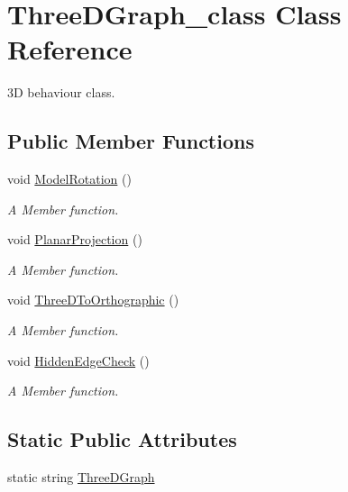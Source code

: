 \hypertarget{classThreeDGraph__class}{}\section{Three\+D\+Graph\+\_\+class Class Reference}
\label{classThreeDGraph__class}


3D behaviour class.  


\subsection*{Public Member Functions}
\begin{DoxyCompactItemize}
\item 
void \hyperlink{classThreeDGraph__class_a4fdbe3499c65fbe0a3e73fa5f69b4ef4}{Model\+Rotation} ()
\begin{DoxyCompactList}\small\item\em A Member function. \end{DoxyCompactList}\item 
void \hyperlink{classThreeDGraph__class_a2103d08609e71ed370b9d3d086446106}{Planar\+Projection} ()
\begin{DoxyCompactList}\small\item\em A Member function. \end{DoxyCompactList}\item 
void \hyperlink{classThreeDGraph__class_ae69c2ee22498d903d1afa6b988edd1b6}{Three\+D\+To\+Orthographic} ()
\begin{DoxyCompactList}\small\item\em A Member function. \end{DoxyCompactList}\item 
void \hyperlink{classThreeDGraph__class_abbcb7f12b95fa17798be30610aca5340}{Hidden\+Edge\+Check} ()
\begin{DoxyCompactList}\small\item\em A Member function. \end{DoxyCompactList}\end{DoxyCompactItemize}
\subsection*{Static Public Attributes}
\begin{DoxyCompactItemize}
\item 
static string \hyperlink{classThreeDGraph__class_a3d1e11ebf54f535d143c864a448136e7}{Three\+D\+Graph}
\end{DoxyCompactItemize}


